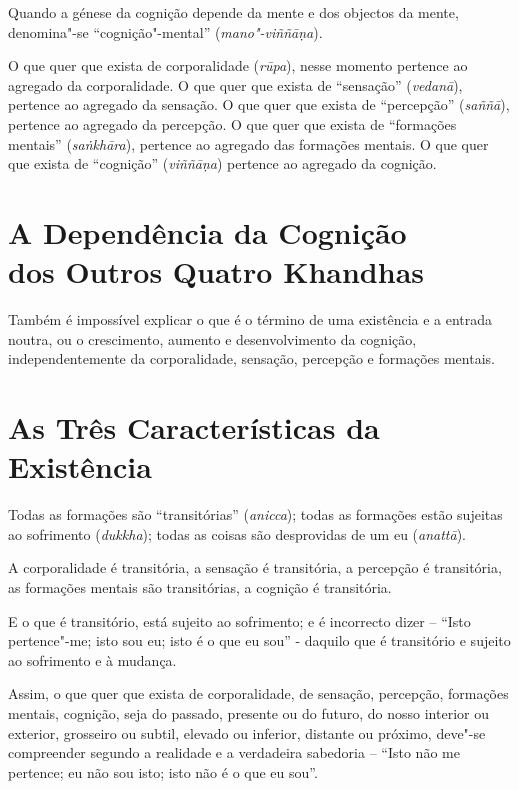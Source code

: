 Quando a génese da cognição depende da mente e dos objectos da mente,
denomina"-se “cognição"-mental” (\emph{mano"-viññāṇa}).


O que quer que exista de corporalidade (\emph{rūpa}), nesse momento pertence ao
agregado da corporalidade. O que quer que exista de “sensação”
(\emph{vedanā}), pertence ao agregado da sensação. O que quer que exista de
“percepção” (\emph{saññā}), pertence ao agregado da percepção. O que quer que
exista de “formações mentais” (\emph{saṅkhāra}), pertence ao agregado das
formações mentais. O que quer que exista de “cognição” (\emph{viññāṇa})
pertence ao agregado da cognição.


\section{A Dependência da Cognição\\ dos Outros Quatro Khandhas}

Também é impossível explicar o que é o término de uma existência e a entrada
noutra, ou o crescimento, aumento e desenvolvimento da cognição,
independentemente da corporalidade, sensação, percepção e formações mentais.


\clearpage

\section{As Três Características da Existência}


Todas as formações são “transitórias” (\emph{anicca}); todas as formações
estão sujeitas ao sofrimento (\emph{dukkha}); todas as coisas são desprovidas de
um eu (\emph{anattā}).


A corporalidade é transitória, a sensação é transitória, a percepção é
transitória, as formações mentais são transitórias, a cognição é transitória.

E o que é transitório, está sujeito ao sofrimento; e é incorrecto dizer --
“Isto pertence"-me; isto sou eu; isto é o que eu sou” - daquilo que é
transitório e sujeito ao sofrimento e à mudança.

Assim, o que quer que exista de corporalidade, de sensação, percepção, formações
mentais, cognição, seja do passado, presente ou do futuro, do nosso interior ou
exterior, grosseiro ou subtil, elevado ou inferior, distante ou próximo, deve"-se
compreender segundo a realidade e a verdadeira sabedoria -- “Isto não me
pertence; eu não sou isto; isto não é o que eu sou”.

